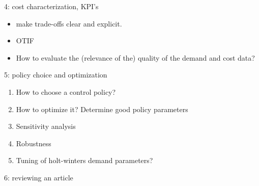 4: cost characterization, KPI's
\begin{itemize}
\item make  trade-offs clear and explicit.
\item OTIF
\item How to evaluate the (relevance of the) quality of the demand and cost data? 
\end{itemize}


5: policy choice and optimization
\begin{enumerate}
\item How to choose a control policy?
\item How to optimize it?  Determine good policy parameters
\item Sensitivity analysis
\item Robustness
\item Tuning of holt-winters demand parameters?
\end{enumerate}

6: reviewing an article


